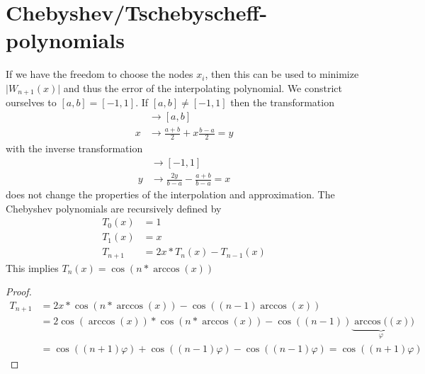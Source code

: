 \section{Chebyshev/Tschebyscheff-polynomials}\label{sec:chebyshev/tschebyscheff-polynomials}
If we have the freedom to choose the nodes $x_i$, then this can be used to minimize $\lvert W_{n+1}(x) \rvert$ and thus
the error of the interpolating polynomial.
We constrict ourselves to $[a,b] = [-1,1]$.
If  $[a,b] \neq [-1,1]$ then the transformation
\begin{align*}
[-1,1]
    &\to [a,b]\\
    x &\to \frac{a+b}{2}+x \frac{b-a}{2}=y
\end{align*}
with the inverse transformation
\begin{align*}
[a,b]
    &\to [-1,1]\\
    y &\to \frac{2y}{b-a}- \frac{a+b}{b-a}=x
\end{align*}
does not change the properties of the interpolation and approximation.
The Chebyshev polynomials are recursively defined by
\begin{align*}
    T_0(x) &= 1\\
    T_1(x) &= x\\
    T_{n+1} &= 2x*T_n(x)-T_{n-1}(x)
\end{align*}
This implies $T_n (x)= \cos(n*\arccos(x))$
\begin{proof}
    \begin{align*}
        T_{n+1} &= 2x*\cos(n*\arccos(x))-\cos((n-1) \arccos(x))\\
        &= 2\cos (\arccos(x))*\cos(n*\arccos(x))-\cos((n-1))\underbrace{\arccos((x)}_\varphi)\\
        &= \cos((n+1) \varphi)+\cos((n-1)\varphi)-\cos((n-1)\varphi) = \cos((n+1) \varphi)
    \end{align*}
\end{proof}

